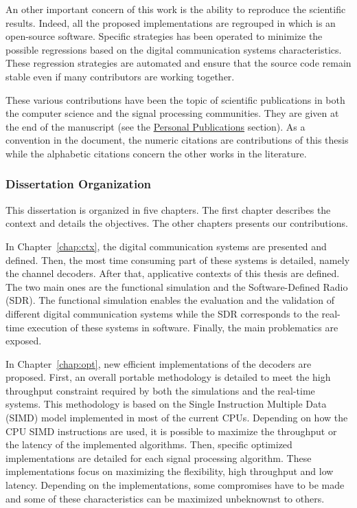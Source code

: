 An other important concern of this work is the ability to reproduce the
scientific results. Indeed, all the proposed implementations are regrouped in
\AFFECT which is an open-source software. Specific strategies has been operated
to minimize the possible regressions based on the digital communication systems
characteristics. These regression strategies are automated and ensure that the
source code remain stable even if many contributors are working together.

These various contributions have been the topic of scientific publications in
both the computer science and the signal processing communities. They are given
at the end of the manuscript (see the \hyperref[sec:publi]{Personal
Publications} section). As a convention in the document, the numeric citations
are contributions of this thesis while the alphabetic citations concern the
other works in the literature.

\subsubsection*{Dissertation Organization}

This dissertation is organized in five chapters. The first chapter describes the
context and details the objectives. The other chapters presents our
contributions.

In Chapter~\ref{chap:ctx}, the digital communication systems are presented and
defined. Then, the most time consuming part of these systems is detailed, namely
the channel decoders. After that, applicative contexts of this thesis are
defined. The two main ones are the functional simulation and the
Software-Defined Radio (SDR). The functional simulation enables the evaluation
and the validation of different digital communication systems while the SDR
corresponds to the real-time execution of these systems in software. Finally,
the main problematics are exposed.

In Chapter~\ref{chap:opt}, new efficient implementations of the decoders are
proposed. First, an overall portable methodology is detailed to meet the high
throughput constraint required by both the simulations and the real-time
systems. This methodology is based on the Single Instruction Multiple Data
(SIMD) model implemented in most of the current CPUs. Depending on how the CPU
SIMD instructions are used, it is possible to maximize the throughput or the
latency of the implemented algorithms. Then, specific optimized implementations
are detailed for each signal processing algorithm. These implementations focus
on maximizing the flexibility, high throughput and low latency. Depending on the
implementations, some compromises have to be made and some of these
characteristics can be maximized unbeknownst to others.

